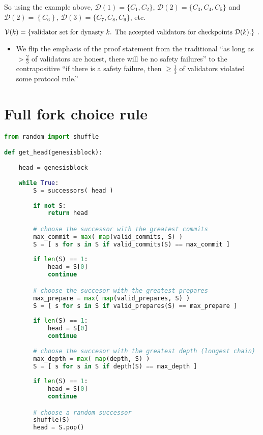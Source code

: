 So using the example above, $\mathcal{D}(1) = \{ C_1, C_2 \}$,  $\mathcal{D}(2) = \{C_3, C_4, C_5\}$ and $\mathcal{D}(2) = \left\{ C_6 \right\}$, $\mathcal{D}(3) = \{ C_7, C_8, C_9\}$, etc.


\begin{equation}
    \mathcal{V}(k) = \left\{ \textnormal{validator set for dynasty $k$.  The accepted validators for checkpoints $\mathcal{D}(k)$.}\right\} \; .
\end{equation}


\begin{itemize}
\item We flip the emphasis of the proof statement from the traditional ``as long as $>\frac{2}{3}$ of validators are honest, there will be no safety failures'' to the contrapositive ``if there is a safety failure, then $\ge \frac{1}{3}$ of validators violated some protocol rule.''
\end{itemize}


\section{Full fork choice rule}

\begin{lstlisting}[language=Python, caption={Algorithm for determining the head of a forked chain}, captionpos=b, label={alg:forkchoice}]
from random import shuffle

def get_head(genesisblock):
    
    head = genesisblock
    
    while True:
        S = successors( head )
        
        if not S:
            return head

        # choose the successor with the greatest commits
        max_commit = max( map(valid_commits, S) )        
        S = [ s for s in S if valid_commits(S) == max_commit ]
        
        if len(S) == 1:
            head = S[0]
            continue

        # choose the succesor with the greatest prepares
        max_prepare = max( map(valid_prepares, S) )
        S = [ s for s in S if valid_prepares(S) == max_prepare ]
        
        if len(S) == 1:
            head = S[0]
            continue
        
        # choose the succesor with the greatest depth (longest chain)
        max_depth = max( map(depth, S) )
        S = [ s for s in S if depth(S) == max_depth ]
        
        if len(S) == 1:
            head = S[0]
            continue

        # choose a random successor
        shuffle(S)
        head = S.pop()

\end{lstlisting}



